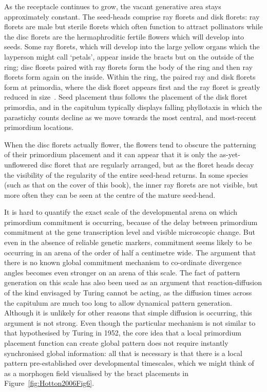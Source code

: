  As the receptacle continues to grow, the vacant generative area stays approximately constant.%
 The seed-heads comprise  ray florets and disk florets: ray florets are male but sterile florets which often function to attract pollinators while the disc florets are the hermaphroditic fertile flowers which will develop into seeds. Some ray florets, which will develop into the large yellow organs which the layperson might call `petals', appear inside the bracts but on the outside of the ring; disc florets paired with ray florets form the body of the ring and then ray florets form again on the inside. Within the ring, the paired ray and disk florets form at primordia, where the disk floret appears first and the ray floret is greatly reduced in size~\autocite{hottonPossibleActualPhyllotaxis2006}.  Seed placement thus follows the placement of 
the disk floret primordia, and  in the capitulum typically displays falling phyllotaxis in which the parastichy counts decline as we move towards the most central, and most-recent primordium locations.

When the disc florets actually flower, the flowers tend to obscure the patterning of their primordium placement and it can appear that it is only the as-yet-unflowered disc floret that are regularly arranged, but as the floret heads decay the visibility of the regularity of the entire seed-head returns.    In some species (such as that on the cover of this book), the inner ray florets are not visible, but more often they can be seen at the centre of the mature seed-head.

It is hard to quantify the exact scale of the developmental arena on which primordium commitment is occurring, because of the delay between primordium commitment at the gene transcription level and visible microscopic change. But even in the absence of reliable genetic markers, commitment seems likely to be occurring in an arena of the order of half a centimetre wide. The  argument that there is no known global commitment mechanism to co-ordinate divergence angles becomes even stronger on an arena of this scale.    The fact of pattern generation on this scale has also been used as an argument that reaction-diffusion of the kind envisaged by Turing cannot be acting, as the diffusion times across the capitulum are much too long to allow dynamical pattern generation. Although it is unlikely for other reasons that simple diffusion is occurring, this argument is not strong.   Even though the particular mechanism is not similar to that hypothesised by Turing in 1952, the core idea that a local primordium placement function can create global pattern does not require instantly synchronised global information: all that is necessary is that there is a local pattern pre-established over developmental timescales, which we might think of as a morphogen field visualised by the bract placements in Figure~\ref{fig:Hotton2006Fig6}. 
 

